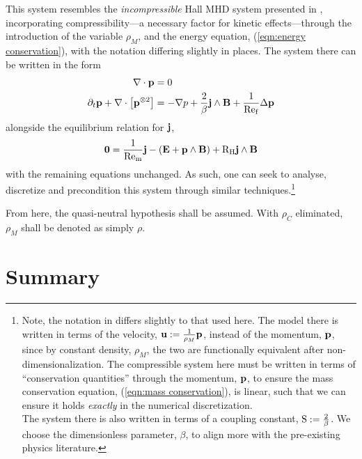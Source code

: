     This system resembles the \emph{incompressible} Hall MHD system presented in \cite{LHF22}, incorporating compressibility—a necessary factor for kinetic effects—through the introduction of the variable $\rho_{M}$, and the energy equation, (\ref{eqn:energy conservation}), with the notation differing slightly in places. The system there can be written in the form
    \begin{align}
        \nabla\cdot\mathbf{p}  &=  0  \label{eqn:incompressible mass conservation} 
         \\
        \partial_{t}\mathbf{p} + \nabla\cdot\left[\mathbf{p}^{\otimes 2}\right]  &=  - \nabla p + \frac{2}{\beta}\mathbf{j}\wedge\mathbf{B} + \frac{1}{\mathrm{Re}_{\mathrm{f}}}\Delta\mathbf{p}  \label{eqn:incompressible momentum conservation}
    \end{align}
    alongside the equilibrium relation for $\mathbf{j}$,
    \begin{equation}\label{eqn:incompressible current identity}
        \mathbf{0}  =  \frac{1}{\mathrm{Re}_{\mathrm{m}}}\mathbf{j} - (\mathbf{E} + \mathbf{p}\wedge\mathbf{B}) + \mathrm{R}_{\mathrm{H}}\mathbf{j}\wedge\mathbf{B}
    \end{equation}
    with the remaining equations unchanged. As such, one can seek to analyse, discretize and precondition this system through similar techniques.\footnote{Note, the notation in \cite{LHF22} differs slightly to that used here. The model there is written in terms of the velocity, $\mathbf{u}  :=  \frac{1}{\rho_{M}}\mathbf{p}$, instead of the momentum, $\mathbf{p}$, since by constant density, $\rho_{M}$, the two are functionally equivalent after non-dimensionalization. The compressible system here must be written in terms of ``conservation quantities'' through the momentum, $\mathbf{p}$, to ensure the mass conservation equation, (\ref{eqn:mass conservation}), is linear, such that we can ensure it holds \emph{exactly} in the numerical discretization. \\ The system there is also written in terms of a coupling constant, $\mathrm{S}  :=  \frac{2}{\beta}$. We choose the dimensionless parameter, $\beta$, to align more with the pre-existing physics literature. \BA{([Ref])}}

    From here, the quasi-neutral hypothesis shall be assumed. With $\rho_{C}$ eliminated, $\rho_{M}$ shall be denoted as simply $\rho$.
    

    
    
    
    
    

    
    \section*{Summary}
    